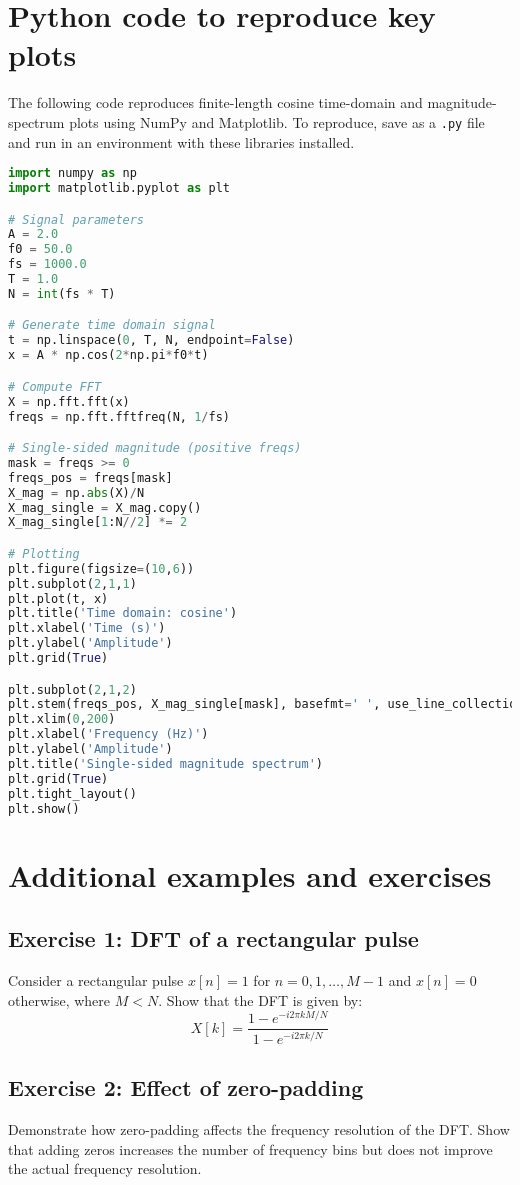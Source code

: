 \documentclass[a4paper]{article}
\begin{document}
\appendix
\section{Python code to reproduce key plots}
The following code reproduces finite-length cosine time-domain and magnitude-spectrum plots using NumPy and Matplotlib. To reproduce, save as a \texttt{.py} file and run in an environment with these libraries installed.

\begin{lstlisting}[language=Python,caption={Simple FFT plotting example}]
import numpy as np
import matplotlib.pyplot as plt

# Signal parameters
A = 2.0
f0 = 50.0
fs = 1000.0
T = 1.0
N = int(fs * T)

# Generate time domain signal
t = np.linspace(0, T, N, endpoint=False)
x = A * np.cos(2*np.pi*f0*t)

# Compute FFT
X = np.fft.fft(x)
freqs = np.fft.fftfreq(N, 1/fs)

# Single-sided magnitude (positive freqs)
mask = freqs >= 0
freqs_pos = freqs[mask]
X_mag = np.abs(X)/N
X_mag_single = X_mag.copy()
X_mag_single[1:N//2] *= 2

# Plotting
plt.figure(figsize=(10,6))
plt.subplot(2,1,1)
plt.plot(t, x)
plt.title('Time domain: cosine')
plt.xlabel('Time (s)')
plt.ylabel('Amplitude')
plt.grid(True)

plt.subplot(2,1,2)
plt.stem(freqs_pos, X_mag_single[mask], basefmt=' ', use_line_collection=True)
plt.xlim(0,200)
plt.xlabel('Frequency (Hz)')
plt.ylabel('Amplitude')
plt.title('Single-sided magnitude spectrum')
plt.grid(True)
plt.tight_layout()
plt.show()
\end{lstlisting}

\section{Additional examples and exercises}
\subsection{Exercise 1: DFT of a rectangular pulse}
Consider a rectangular pulse $x[n] = 1$ for $n = 0, 1, \ldots, M-1$ and $x[n] = 0$ otherwise, where $M < N$. Show that the DFT is given by:
\begin{equation}
X[k] = \frac{1 - e^{-i2\pi k M/N}}{1 - e^{-i2\pi k/N}}
\end{equation}

\subsection{Exercise 2: Effect of zero-padding}
Demonstrate how zero-padding affects the frequency resolution of the DFT. Show that adding zeros increases the number of frequency bins but does not improve the actual frequency resolution.
\end{document}
